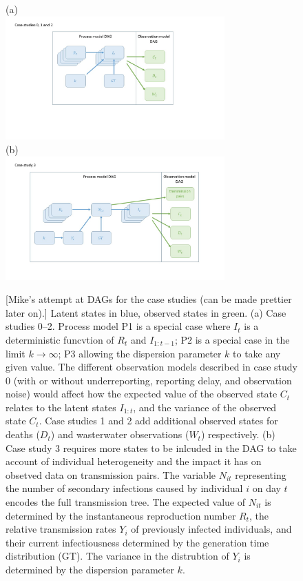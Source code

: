 \documentclass{article}
\begin{document}
\begin{enumerate}
\begin{figure}
\centering
(a) \\
\includegraphics[width=0.75\textwidth]{figures/case_study_0_1_2.jpg}\\
(b)\\
\includegraphics[width=0.75\textwidth]{figures/case_study_3.jpg}
\label{fig:CS3_DAG}
\caption{[Mike's attempt at DAGs for the case studies (can be made prettier later on).] Latent states in blue, observed states in green. (a) Case studies 0--2. Process model P1 is a special case where $I_t$ is a deterministic funcvtion of $R_t$ and $I_{1:t-1}$; P2 is a special case in the limit $k\to\infty$; P3 allowing the dispersion parameter $k$ to take any given value. The different observation models described in case study 0 (with or without underreporting, reporting delay, and observation noise) would affect how the expected value of the observed state $C_t$ relates to the latent states $I_{1:t}$, and the variance of the observed state $C_t$. Case studies 1 and 2 add additional observed states for deaths ($D_t$) and wasterwater observations ($W_t$) respectively. (b) Case study 3 requires more states to be inlcuded in the DAG to take account of individual heterogeneity and the impact it has on obsetved data on transmission pairs. The variable $N_{it}$ representing the number of secondary infections caused by individual $i$ on day $t$ encodes the full transmission tree. The expected value of $N_{it}$ is determined by the instantaneous reproduction number $R_t$, the relative transmission rates $Y_i$ of previously infected individuals, and their current infectiousness determined by the generation time distribution (GT). The variance in the distrubtion of $Y_i$ is determined by the dispersion parameter $k$.  }
\end{figure}


\end{enumerate}
\end{document}

